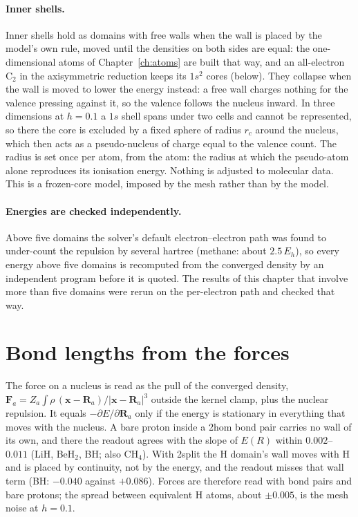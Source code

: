 \paragraph{Inner shells.} Inner shells hold as domains with free walls when the wall is placed by the model's
own rule, moved until the densities on both sides are equal: the one-dimensional atoms of
Chapter~\ref{ch:atoms} are built that way, and an all-electron C$_2$ in the axisymmetric reduction keeps its
$1s^2$ cores (below). They collapse when the wall is moved to lower the energy instead: a free wall charges
nothing for the valence pressing against it, so the valence follows the nucleus inward. In three dimensions
at $h = 0.1$ a $1s$ shell spans under two cells and cannot be represented, so there the core is excluded by
a fixed sphere of radius $r_c$ around the nucleus, which then acts as a pseudo-nucleus of charge equal to the
valence count. The radius is set once per atom, from the atom: the radius at which the pseudo-atom alone
reproduces its ionisation energy. Nothing is adjusted to molecular data. This is a frozen-core model,
imposed by the mesh rather than by the model.

\paragraph{Energies are checked independently.} Above five domains the solver's default
electron--electron path was found to under-count the repulsion by several hartree (methane: about
$2.5\,E_h$), so every energy above five domains is recomputed from the converged density by an
independent program before it is quoted. The results of this chapter that involve more than five domains
were rerun on the per-electron path and checked that way.

\section{Bond lengths from the forces}\label{sec:group1}\label{sec:group2}\label{sec:hydride-forces}

The force on a nucleus is read as the pull of the converged density, $\mathbf{F}_a = Z_a\int\rho\,
(\mathbf{x}-\mathbf{R}_a)/|\mathbf{x}-\mathbf{R}_a|^3$ outside the kernel clamp, plus the nuclear
repulsion. It equals $-\partial E/\partial\mathbf{R}_a$ only if the energy is stationary in everything
that moves with the nucleus. A bare proton inside a 2hom bond pair carries no wall of its own, and
there the readout agrees with the slope of $E(R)$ within $0.002$--$0.011$ (LiH, BeH$_2$, BH; also
CH$_4$). With 2split the H domain's wall moves with H and is placed by continuity,
not by the energy, and the readout misses that wall term (BH: $-0.040$ against $+0.086$). Forces are therefore read with bond pairs and bare protons; the spread between
equivalent H atoms, about $\pm0.005$, is the mesh noise at $h = 0.1$.

